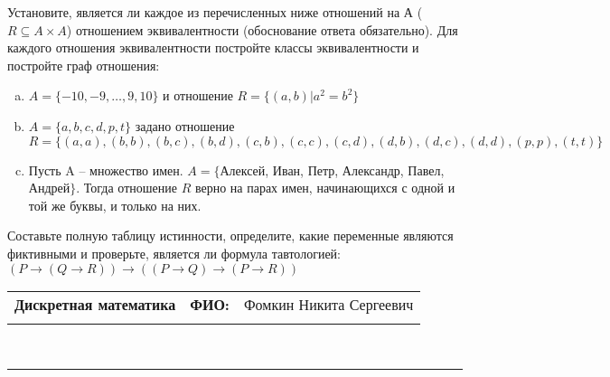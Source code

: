 \documentclass[10pt]{exam}
\newcommand{\class}{Дискретная математика}
\newcommand{\examdate}{}
\begin{document}
\begin{questions}
\question
Установите, является ли каждое из перечисленных ниже отношений на А ($R \subseteq A \times A$) отношением эквивалентности (обоснование ответа обязательно). Для каждого отношения эквивалентности постройте классы 
эквивалентности и постройте граф отношения:
\begin{enumerate} [a)]\setcounter{enumi}{0}
\item $A = \{-10, -9, … , 9, 10\}$ и отношение $R = \{(a,b)|a^{2} = b^{2}\}$
\item $A = \{a, b, c, d, p, t\}$ задано отношение $R = \{(a, a), (b, b), (b, c), (b, d), (c, b), (c, c), (c, d), (d, b), (d, c), (d, d), (p,p), (t,t)\}$
\item Пусть A – множество имен. $A = \{ $Алексей, Иван, Петр, Александр, Павел, Андрей$ \}$. Тогда отношение $R$ верно на парах имен, начинающихся с одной и той же буквы, и только на них.
\end{enumerate}\question Составьте полную таблицу истинности, определите, какие переменные являются фиктивными и проверьте, является ли формула тавтологией:
$(P \rightarrow (Q \rightarrow R)) \rightarrow ((P \rightarrow Q) \rightarrow (P \rightarrow R))$

\end{questions}
\newpage
\begin{flushright}
\begin{tabular}{p{2.8in} r l}
\textbf{\class} & \textbf{ФИО:} &Фомкин Никита Сергеевич
\\

\textbf{\examdate} &&\\
\end{tabular}\\
\end{flushright}
\rule[1ex]{\textwidth}{.1pt}
\end{document}
